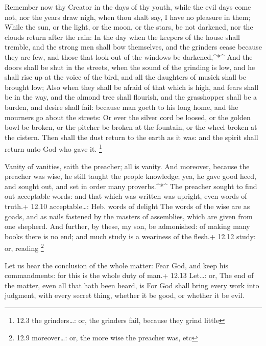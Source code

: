  Remember now thy Creator in the days of thy youth, while
the evil days come not, nor the years draw nigh, when thou shalt say, I
have no pleasure in them;  While the sun, or the light, or
the moon, or the stars, be not darkened, nor the clouds return after the
rain:  In the day when the keepers of the house shall
tremble, and the strong men shall bow themselves, and the grinders cease
because they are few, and those that look out of the windows be
darkened,\^{}*\^{}  And the doors shall be shut in the
streets, when the sound of the grinding is low, and he shall rise up at
the voice of the bird, and all the daughters of musick shall be brought
low;  Also when they shall be afraid of that which is high,
and fears shall be in the way, and the almond tree shall flourish, and
the grasshopper shall be a burden, and desire shall fail: because man
goeth to his long home, and the mourners go about the streets:
 Or ever the silver cord be loosed, or the golden bowl be
broken, or the pitcher be broken at the fountain, or the wheel broken at
the cistern.  Then shall the dust return to the earth as it
was: and the spirit shall return unto God who gave it. \footnote{12.3
  the grinders\ldots: or, the grinders fail, because they grind little}

 Vanity of vanities, saith the preacher; all is vanity.
 And moreover, because the preacher was wise, he still
taught the people knowledge; yea, he gave good heed, and sought out, and
set in order many proverbs.\^{}*\^{}  The preacher sought
to find out acceptable words: and that which was written was upright,
even words of truth.+ 12.10 acceptable\ldots: Heb. words of delight
 The words of the wise are as goads, and as nails fastened
by the masters of assemblies, which are given from one shepherd.
 And further, by these, my son, be admonished: of making
many books there is no end; and much study is a weariness of the flesh.+
12.12 study: or, reading \footnote{12.9 moreover\ldots: or, the more
  wise the preacher was, etc}

 Let us hear the conclusion of the whole matter: Fear God,
and keep his commandments: for this is the whole duty of man.+ 12.13
Let\ldots: or, The end of the matter, even all that hath been heard, is
 For God shall bring every work into judgment, with every
secret thing, whether it be good, or whether it be evil.
